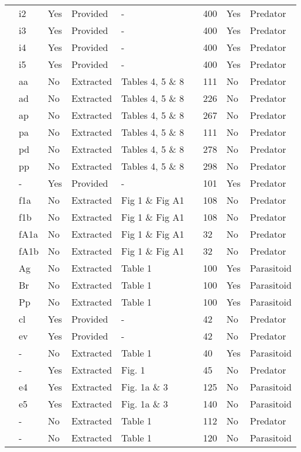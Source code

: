 \begin{longtable}{lllllllll}
\citet{Elliott:2005aa}&i2&Yes&Provided&-&\citet{Elliott:2020aa}&400&Yes&Predator\tabularnewline
\citet{Elliott:2005aa}&i3&Yes&Provided&-&\citet{Elliott:2020aa}&400&Yes&Predator\tabularnewline
\citet{Elliott:2005aa}&i4&Yes&Provided&-&\citet{Elliott:2020aa}&400&Yes&Predator\tabularnewline
\citet{Elliott:2005aa}&i5&Yes&Provided&-&\citet{Elliott:2020aa}&400&Yes&Predator\tabularnewline
\citet{Eveleigh:1982aa}&aa&No&Extracted&Tables 4, 5 \& 8&\citet{Novak:2020aa}&111&No&Predator\tabularnewline
\citet{Eveleigh:1982aa}&ad&No&Extracted&Tables 4, 5 \& 8&\citet{Novak:2020aa}&226&No&Predator\tabularnewline
\citet{Eveleigh:1982aa}&ap&No&Extracted&Tables 4, 5 \& 8&\citet{Novak:2020aa}&267&No&Predator\tabularnewline
\citet{Eveleigh:1982aa}&pa&No&Extracted&Tables 4, 5 \& 8&\citet{Novak:2020aa}&111&No&Predator\tabularnewline
\citet{Eveleigh:1982aa}&pd&No&Extracted&Tables 4, 5 \& 8&\citet{Novak:2020aa}&278&No&Predator\tabularnewline
\citet{Eveleigh:1982aa}&pp&No&Extracted&Tables 4, 5 \& 8&\citet{Novak:2020aa}&298&No&Predator\tabularnewline
\citet{Fussmann:2005aa}&-&Yes&Provided&-&\citet{Fussmann:2020aa}&101&Yes&Predator\tabularnewline
\citet{Griffen:2007aa}&f1a&No&Extracted&Fig 1 \& Fig A1&\citet{Novak:2020aa}&108&No&Predator\tabularnewline
\citet{Griffen:2007aa}&f1b&No&Extracted&Fig 1 \& Fig A1&\citet{Novak:2020aa}&108&No&Predator\tabularnewline
\citet{Griffen:2007aa}&fA1a&No&Extracted&Fig 1 \& Fig A1&\citet{Novak:2020aa}&32&No&Predator\tabularnewline
\citet{Griffen:2007aa}&fA1b&No&Extracted&Fig 1 \& Fig A1&\citet{Novak:2020aa}&32&No&Predator\tabularnewline
\citet{Hassan:1976aa}&Ag&No&Extracted&Table 1&\citet{Novak:2020aa}&100&Yes&Parasitoid\tabularnewline
\citet{Hassan:1976aa}&Br&No&Extracted&Table 1&\citet{Novak:2020aa}&100&Yes&Parasitoid\tabularnewline
\citet{Hassan:1976aa}&Pp&No&Extracted&Table 1&\citet{Novak:2020aa}&100&Yes&Parasitoid\tabularnewline
\citet{Hossie:2016aa}&cl&Yes&Provided&-&\citet{Hossie:2020aa}&42&No&Predator\tabularnewline
\citet{Hossie:2016aa}&ev&Yes&Provided&-&\citet{Hossie:2020aa}&42&No&Predator\tabularnewline
\citet{Huffaker:1982aa}&-&No&Extracted&Table 1&\citet{Novak:2020aa}&40&Yes&Parasitoid\tabularnewline
\citet{Johnson:2006aa}&-&Yes&Extracted&Fig. 1&\citet{Novak:2020aa}&45&No&Predator\tabularnewline
\citet{Jones:1988aa, Jones:1986aa}&e4&Yes&Extracted&Fig. 1a \& 3&\citet{Novak:2020aa}&125&No&Parasitoid\tabularnewline
\citet{Jones:1988aa, Jones:1986aa}&e5&Yes&Extracted&Fig. 1a \& 3&\citet{Novak:2020aa}&140&No&Parasitoid\tabularnewline
\citet{Katz:1985ai}&-&No&Extracted&Table 1&\citet{Arditi:1990sp}&112&No&Predator\tabularnewline
\citet{Kfir:1983aa}&-&No&Extracted&Table 1&\citet{Novak:2020aa}&120&No&Parasitoid\tabularnewline

\end{longtable}
